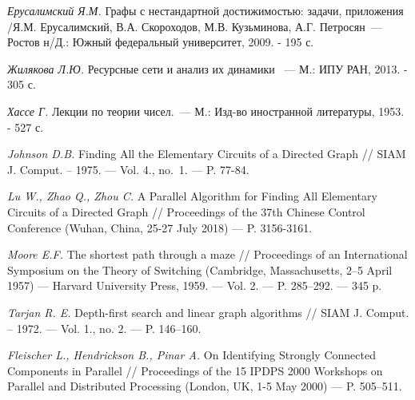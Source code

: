 
\begin{itemize}
 \textit{Ерусалимский Я.М.} Графы с нестандартной достижимостью: задачи, приложения /Я.М. Ерусалимский, В.А. Скороходов, М.В. Кузьминова, А.Г. Петросян~--- Ростов н/Д.: Южный федеральный университет, 2009. - 195 с.

 \textit{Жилякова Л.Ю.} Ресурсные сети и анализ их динамики ~--- М.: ИПУ РАН, 2013. - 305 с.

 \textit{Хассе Г.} Лекции по теории чисел.~--- М.: Изд-во иностранной литературы, 1953. - 527 с.

 \textit{Johnson D.B.} Finding All the Elementary Circuits of a Directed Graph // SIAM J. Comput. – 1975. — Vol. 4., no.~1. — P. 77-84.

 \textit{Lu W., Zhao Q., Zhou C.} A Parallel Algorithm for Finding All Elementary Circuits of a Directed Graph // Proceedings of the 37th Chinese Control Conference (Wuhan, China, 25-27 July 2018) — P. 3156-3161.

 \textit{Moore E.F.} The shortest path through a maze // Proceedings of an International Symposium on the Theory of Switching (Cambridge, Massachusetts, 2–5 April 1957) — Harvard University Press, 1959. — Vol. 2. — P. 285–292. — 345 p.

 \textit{Tarjan R. E.} Depth-first search and linear graph algorithms // SIAM J. Comput. – 1972. — Vol. 1., no. 2. — P. 146–160. 

 \textit{Fleischer L., Hendrickson B., Pinar A.} On Identifying Strongly Connected Components in Parallel // Proceedings of the 15 IPDPS 2000 Workshops on Parallel and Distributed Processing (London, UK, 1-5 May 2000) — P. 505–511.

\end{itemize}

